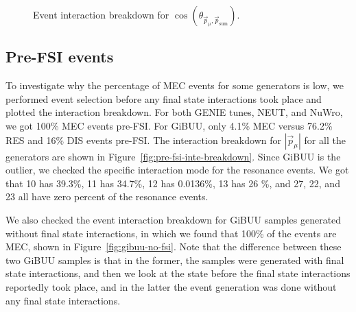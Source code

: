 \documentclass{article}
\newcommand{\vm}{\vec{p}_\mu}
\newcommand{\vtp}{\vec{p}_{\text{sum}}}
\begin{document}
\begin{figure}
    \caption{Event interaction breakdown for $\cos(\theta_{\vm,\vtp})$.}
    \label{fig:inte-breakdown-cos-opening-angle-muon-total-proton}
\end{figure}

\clearpage

\subsection{Pre-FSI events}

To investigate why the percentage of MEC events for some generators is low, we performed event selection before any final state interactions took place and plotted the interaction breakdown. 
For both GENIE tunes, NEUT, and NuWro, we got 100\% MEC events pre-FSI. For GiBUU, only 4.1\% MEC versus 76.2\% RES and 16\% DIS events pre-FSI. 
The interaction breakdown for $|\vm|$ for all the generators are shown in Figure~\ref{fig:pre-fsi-inte-breakdown}. 
Since GiBUU is the outlier, we checked the specific interaction mode for the resonance events. We got that 10 has 39.3\%, 11 has 34.7\%, 12 has 0.0136\%, 13 has 26 \%, and 27, 22, and 23 all have zero percent of the resonance events. 

We also checked the event interaction breakdown for GiBUU samples generated without final state interactions, in which we found that 100\% of the events are MEC, shown in Figure~\ref{fig:gibuu-no-fsi}.
Note that the difference between these two GiBUU samples is that in the former, the samples were generated with final state interactions, and then we look at the state before the final state interactions reportedly took place, 
and in the latter the event generation was done without any final state interactions.
\end{document}
